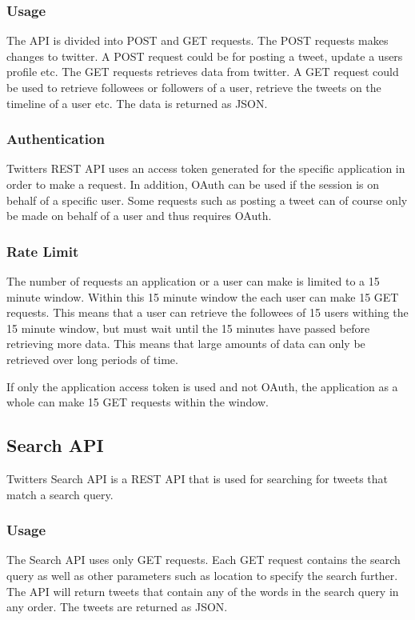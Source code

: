 \subsubsection{Usage}
The API is divided into POST and GET requests. The POST requests makes changes to twitter. A POST request could be for posting a tweet, update a users profile etc. The GET requests retrieves data from twitter. A GET request could be used to retrieve followees or followers of a user, retrieve the tweets on the timeline of a user etc. The data is returned as JSON. \cite{twitter-rest-api}

\subsubsection{Authentication}
Twitters REST API uses an access token generated for the specific application in order to make a request. In addition, OAuth can be used if the session is on behalf of a specific user. Some requests such as posting a tweet can of course only be made on behalf of a user and thus requires OAuth. \cite{twitter-rest-api}

\subsubsection{Rate Limit}
The number of requests an application or a user can make is limited to a 15 minute window. Within this 15 minute window the each user can make 15 GET requests. This means that a user can retrieve the followees of 15 users withing the 15 minute window, but must wait until the 15 minutes have passed before retrieving more data. This means that large amounts of data can only be retrieved over long periods of time.

If only the application access token is used and not OAuth, the application as a whole can make 15 GET requests within the window. \cite{twitter-rate-limiting}

\subsection{Search API}
Twitters Search API is a REST API that is used for searching for tweets that match a search query.

\subsubsection{Usage}
The Search API uses only GET requests. Each GET request contains the search query as well as other parameters such as location to specify the search further. The API will return tweets that contain any of the words in the search query in any order. The tweets are returned as JSON.\cite{twitter-rest-api}

